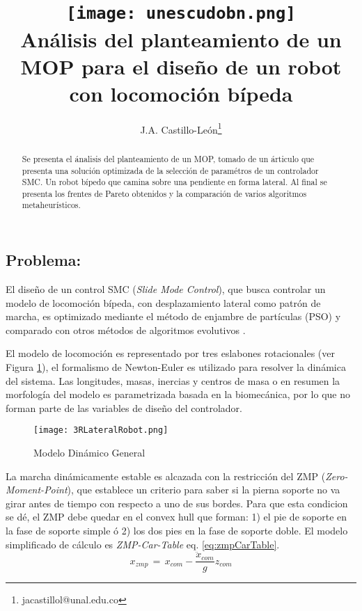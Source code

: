 \documentclass[10pt,onecolumn,twoside,letterpaper]{article}
\title{\vspace{-0.8cm}\texttt{[image: unescudobn.png]}\\\vspace{-0.0cm}
  \LARGE \textbf{An\'alisis del planteamiento de un MOP para el dise\~no de un robot con locomoci\'on b\'ipeda}}
\author{J.A. Castillo-Le\'on\thanks{jacastillol@unal.edu.co}}
\date{}
\begin{document}
\maketitle
\begin{abstract}\small
Se presenta el \'analisis del planteamiento de un MOP, tomado de un \'articulo que presenta una soluci\'on optimizada de la selecci\'on de param\'etros de un controlador SMC. Un robot b\'ipedo que camina sobre una pendiente en forma lateral. Al final se presenta los frentes de Pareto obtenidos y la comparaci\'on de varios algoritmos metaheur\'isticos. 
\end{abstract}
\begin{multicols}{2}
\section{Problema:}
El dise\~no de un control SMC (\emph{Slide Mode Control}), que busca controlar un modelo de locomoci\'on b\'ipeda, con desplazamiento lateral como patr\'on de marcha, es optimizado mediante el m\'etodo de enjambre de part\'iculas (PSO) y comparado con otros m\'etodos de algoritmos evolutivos \cite{Mahmoodabadi2014}.
\par El modelo de locomoci\'on es representado por tres eslabones rotacionales (ver Figura \ref{fig:modelo}), el formalismo de Newton-Euler es utilizado para resolver la din\'amica del sistema. Las longitudes, masas, inercias y centros de masa o en resumen la morfolog\'ia del modelo es parametrizada basada en la biomec\'anica, por lo que no forman parte de las variables de dise\~no del controlador\cite{Mahmoodabadi2014}.
\begin{figure}[H]
  \centering
  \texttt{[image: 3RLateralRobot.png]}
  \caption{Modelo Din\'amico General}
  \label{fig:modelo}
\end{figure}
\par La marcha din\'amicamente estable es alcazada con la restricci\'on del ZMP (\emph{Zero-Moment-Point}), que establece un criterio para saber si la pierna soporte no va girar antes de tiempo con respecto a uno de sus bordes. Para que esta condicion se d\'e, el ZMP debe quedar en el convex hull que forman: 1) el pie de soporte en la fase de soporte simple \'o 2) los dos pies en la fase de soporte doble. El modelo simplificado de c\'alculo es \emph{ZMP-Car-Table} eq. \ref{eq:zmpCarTable}.
\begin{equation}
  \label{eq:zmpCarTable}
  x_{zmp}\,=\,x_{com}-\frac{\ddot{x}_{com}}{g}z_{com}
\end{equation}

\end{multicols}
\end{document}
